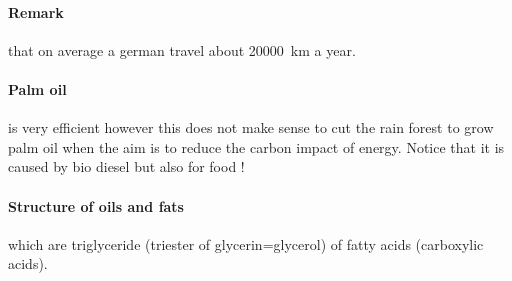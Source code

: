 \documentclass[10pt,a4paper]{article}
\begin{document}
\paragraph{Remark}that on average a german travel about \SI{20000}{\kilo\meter} a year. 

\paragraph{Palm oil}is very efficient however this does not make sense to cut the rain forest to grow palm oil when the aim is to reduce the carbon impact of energy. Notice that it is caused by bio diesel but also for food !

\paragraph{Structure of oils and fats}which are triglyceride (triester of glycerin=glycerol) of fatty acids (carboxylic acids).


\paragraph{\color{red}{tri}\color{violet}{glyceri}\color{green}{de} \color{black}{of} \color{blue}{fatty acids}} 
\end{document}
